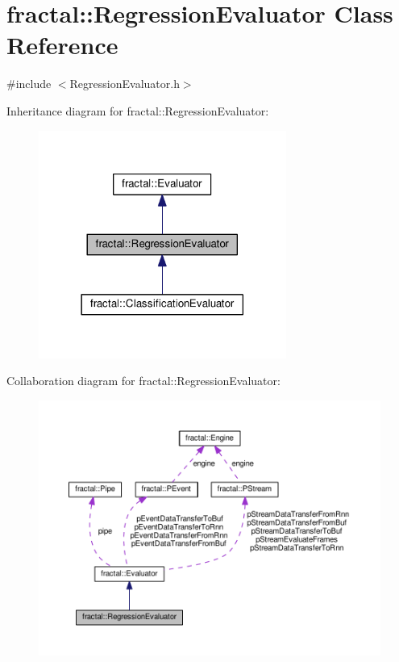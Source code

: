 \hypertarget{classfractal_1_1RegressionEvaluator}{\section{fractal\+:\+:Regression\+Evaluator Class Reference}
\label{classfractal_1_1RegressionEvaluator}
}


{\ttfamily \#include $<$Regression\+Evaluator.\+h$>$}



Inheritance diagram for fractal\+:\+:Regression\+Evaluator\+:\nopagebreak
\begin{figure}[H]
\begin{center}
\leavevmode
\includegraphics[width=230pt]{d0/d94/classfractal_1_1RegressionEvaluator__inherit__graph}
\end{center}
\end{figure}


Collaboration diagram for fractal\+:\+:Regression\+Evaluator\+:\nopagebreak
\begin{figure}[H]
\begin{center}
\leavevmode
\includegraphics[width=350pt]{da/d79/classfractal_1_1RegressionEvaluator__coll__graph}
\end{center}
\end{figure}
